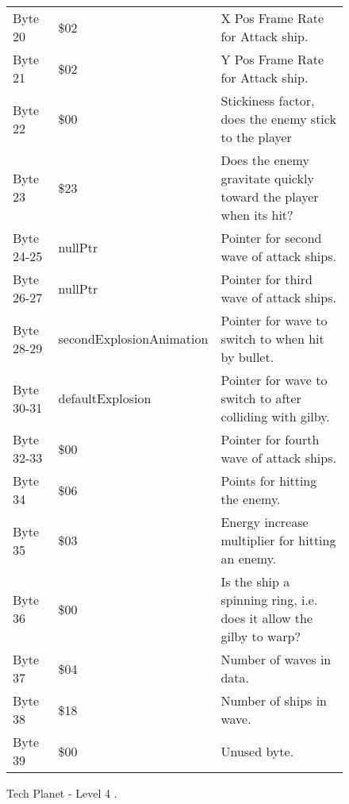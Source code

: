 \begin{figure}[H]
{\begin{adjustbox}{width=12cm}
\begin{tabular}{lll}
 Byte 20    & \$02                      & X Pos Frame Rate for Attack ship.                                   \\
 Byte 21    & \$02                      & Y Pos Frame Rate for Attack ship.                                   \\
 Byte 22    & \$00                      & Stickiness factor, does the enemy stick to the player               \\
 Byte 23    & \$23                      & Does the enemy gravitate quickly toward the player when its hit?    \\
 Byte 24-25 & nullPtr                  & Pointer for second wave of attack ships.                            \\
 Byte 26-27 & nullPtr                  & Pointer for third wave of attack ships.                             \\
 Byte 28-29 & secondExplosionAnimation & Pointer for wave to switch to when hit by bullet.                   \\
 Byte 30-31 & defaultExplosion         & Pointer for  wave to switch to after colliding with gilby.          \\
 Byte 32-33 & \$00                      & Pointer for fourth wave of attack ships.                            \\
 Byte 34    & \$06                      & Points for hitting the enemy.                                       \\
 Byte 35    & \$03                      & Energy increase multiplier for hitting an enemy.                    \\
 Byte 36    & \$00                      & Is the ship a spinning ring, i.e. does it allow the gilby to warp?  \\
 Byte 37    & \$04                      & Number of waves in data.                                            \\
 Byte 38    & \$18                      & Number of ships in wave.                                            \\
 Byte 39    & \$00                      & Unused byte.                                                        \\
\bottomrule
\end{tabular}

  \end{adjustbox}

  }\caption*{Tech Planet - Level 4
.}
\end{figure}

